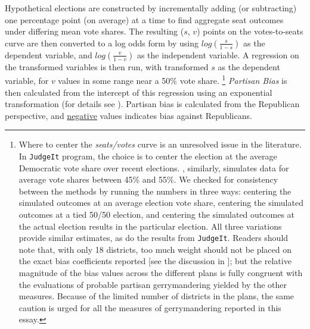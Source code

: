\par
    Hypothetical elections are constructed by incrementally adding (or subtracting) one percentage point (on average) at a time to find aggregate seat outcomes under differing mean vote shares. The resulting ($s$, $v$) points on the votes-to-seats curve are then converted to a log odds form by using $ log(\frac{s}{1-s}) $ as the dependent variable, and $ log(\frac{v}{1-v}) $ as the independent variable. A regression on the transformed variables is then run, with transformed $s$ as the dependent variable, for $v$ values in some range near a 50\% vote share. 
    \footnote{Where to center the \textit{seats/votes} curve is an unresolved issue in the literature. In \citet{GelmanKing1994_unifiedAJPS} \texttt{JudgeIt} program, the choice is to center the election at the average Democratic vote share over recent elections. \citet{Kastellec_et_al_2008_PS}, similarly, simulates data for average vote shares between 45\% and 55\%. We checked for consistency between the methods by running the numbers in three ways: centering the simulated outcomes at an average election vote share, centering the simulated outcomes at a tied 50/50 election, and centering the simulated outcomes at the actual election results in the particular election. All three variations provide similar estimates, as do the results from \texttt{JudgeIt}. Readers should note that, with only 18 districts, too much weight should not be placed on the exact bias coefficients reported [see the discussion in \citet{Browning_King_1987_seats_votes}]; but the relative magnitude of the bias values across the different plans is fully congruent with the evaluations of probable partisan gerrymandering yielded by the other measures. Because of the limited number of districts in the plans, the same caution is urged for all the measures of gerrymandering reported in this essay.} 
    \textit{Partisan Bias} is then calculated from the intercept of this regression using an exponential transformation (for details see \citet{Grofman1983}). Partisan bias is calculated from the Republican perspective, and \underline{negative} values indicates bias against Republicans.
\par
